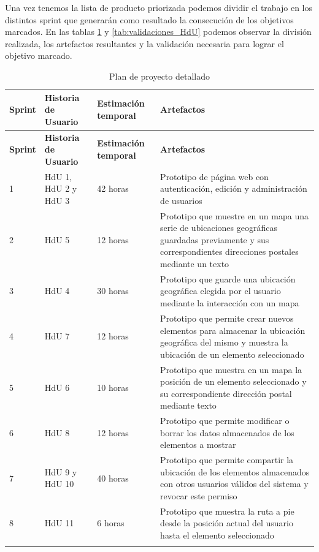 Una vez tenemos la lista de producto priorizada podemos dividir el trabajo en los distintos sprint que generarán como resultado la consecución de los objetivos marcados. En las tablas \ref{tab:plan_proyecto} y \ref{tab:validaciones_HdU} podemos observar la división realizada, los artefactos resultantes y la validación necesaria para lograr el objetivo marcado.

\begin{longtable}{p{1cm} p{4cm} p{4cm} p{6cm}}
  	\hline  	    
  	\multicolumn{1}{p{1cm}}{\cellcolor{black!30}\textbf{Sprint}} &
    \multicolumn{1}{p{4cm}}{\cellcolor{black!30}\textbf{Historia de Usuario}} & 
 	\multicolumn{1}{p{4cm}}{\cellcolor{black!30}\textbf{Estimación temporal}} &
 	\multicolumn{1}{p{6cm}}{\cellcolor{black!30}\textbf{Artefactos}}
 	\\
 	\toprule 
   	\endfirsthead
     
    \hline
  	\multicolumn{1}{p{1cm}}{\cellcolor{black!30}\textbf{Sprint}} &
    \multicolumn{1}{p{4cm}}{\cellcolor{black!30}\textbf{Historia de Usuario}} & 
 	\multicolumn{1}{p{4cm}}{\cellcolor{black!30}\textbf{Estimación temporal}} &
 	\multicolumn{1}{p{6cm}}{\cellcolor{black!30}\textbf{Artefactos}}
 	\\	 
 	\toprule
 	\endhead

	\rowcolor{gray!25}
	1	& HdU 1, HdU 2 y HdU 3	&	42 horas	&	Prototipo de página web con autenticación, edición y administración de usuarios \\ 
	2	& HdU 5					&	12 horas	&	Prototipo que muestre en un mapa una serie de ubicaciones geográficas guardadas previamente y sus correspondientes direcciones postales mediante un texto \\
	\rowcolor{gray!25}
	3	& HdU 4				&	30 horas	&	Prototipo que guarde una ubicación geográfica elegida por el usuario mediante la interacción con un mapa \\
	4	& HdU 7					&	12 horas	&	Prototipo que permite crear nuevos elementos para almacenar la ubicación geográfica del mismo y muestra la ubicación de un elemento seleccionado \\
	\rowcolor{gray!25}
	5	& HdU 6					& 	10 horas	& 	Prototipo que muestra en un mapa la posición de un elemento seleccionado y su correspondiente dirección postal mediante texto\\
	6	& HdU 8					&	12 horas	&	Prototipo que permite modificar o borrar los datos almacenados de los elementos a mostrar \\
	\rowcolor{gray!25}
	7	& HdU 9 y HdU 10		&	40 horas	&	Prototipo que permite compartir la ubicación de los elementos almacenados con otros usuarios válidos del sistema y revocar este permiso \\
	8	& HdU 11				&	6 horas		&	Prototipo que muestra la ruta a pie desde la posición actual del usuario hasta el elemento seleccionado \\

	\hline
	\caption{Plan de proyecto detallado}
	\label{tab:plan_proyecto}
\end{longtable}

